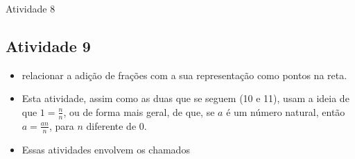 \begin{multicols}{2}
\begin{resposta*}{Atividade 8}
  
\end{resposta*}



\clearpage

\subsection{Atividade 9}

\newline \vspace{.15cm}

\begin{itemize} %
  \item     relacionar a adição de frações com a sua representação como pontos na reta.
\end{itemize} %


 \vspace{.15cm}

\begin{itemize} %
  \item     Esta atividade, assim como as duas que se seguem (10 e 11),   usam a ideia de que     $1 = \frac{n}{n}$, ou de forma mais geral, de que, se     $a$     é um número natural, então     $a = \frac{an}{n}$, para     $n$     diferente de 0.  
  \item Essas atividades envolvem os chamados 
\end{itemize} %

\end{multicols}


